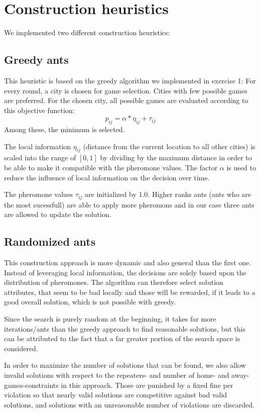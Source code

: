 \section{Construction heuristics}

We implemented two different construction heuristics:

\subsection{Greedy ants}
This heuristic is based on the greedy algorithm we implemented in exercise 1: For every round, a city is chosen for game selection.
Cities with few possible games are preferred.
For the chosen city, all possible games are evaluated according to this objective function:
$$ p_{ij} = \alpha * \eta_{ij} + \tau_{ij}  $$
Among these, the minimum is selected.

The local information $\eta_{ij}$ (distance from the current location to all other cities) is scaled into the range of $[0,1]$ by dividing by the maximum distance in order to be able to make it compatible with the pheromone values.
The factor $\alpha$ is used to reduce the influence of local information on the decision over time.

The pheromone values $\tau_{ij}$ are initialized by 1.0.
Higher ranks ants (ants who are the most sucessfull) are able to apply more
pheromons and in our case three ants are allowed to update the solution.

\subsection{Randomized ants}

This construction approach is more dynamic and also general than the first one.
Instead of leveraging local information, the decisions are solely based upon the distribution of pheromones. 
The algorithm can therefore select solution attributes, that seem to be bad locally and those will be rewarded, if it leads to a good overall solution, which is not possible with greedy.

Since the search is purely random at the beginning, it takes far more iterations/ants than the greedy approach to find reasonable solutions, but this can be attributed to the fact that a far greater portion of the search space is considered. 

In order to maximize the number of solutions that can be found, we also allow invalid solutions with respect to the repeaters- and number of home- and away-games-constraints in this approach.
Those are punished by a fixed fine per violation so that nearly valid solutions are competitive against bad valid solutions, and solutions with an unreasonable number of violations are discarded.

